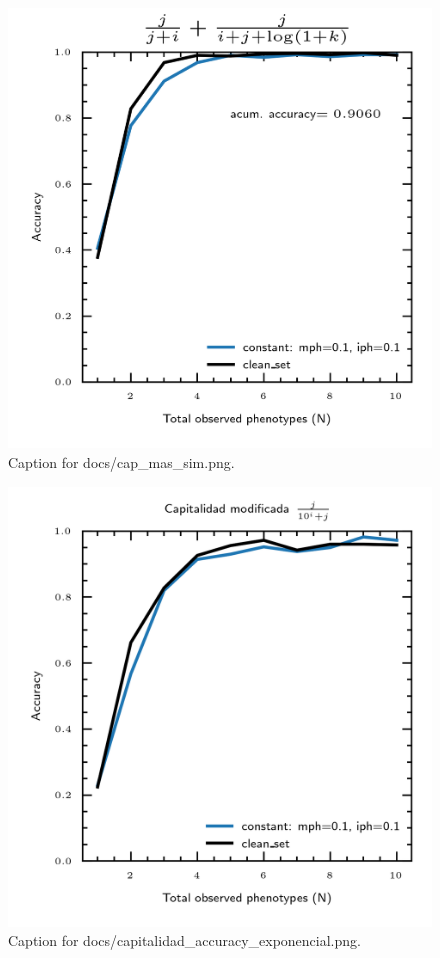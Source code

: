\documentclass{article}
\begin{document}
\begin{figure}[h] \centering \includegraphics{docs/cap_mas_sim.png} \caption{Caption for docs/cap_mas_sim.png.} \end{figure}
\begin{figure}[h] \centering \includegraphics{docs/capitalidad_accuracy_exponencial.png} \caption{Caption for docs/capitalidad_accuracy_exponencial.png.} \end{figure}
\end{document}
